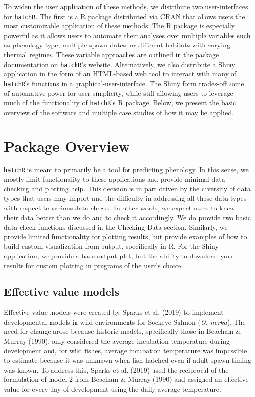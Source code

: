 \documentclass[12pt,halfline,a4paper,]{ouparticle}
\begin{document}
To widen the user application of these methods, we distribute two
user-interfaces for \texttt{hatchR}. The first is a R package
distributed via CRAN that allows users the most customizable application
of these methods. The R package is especially powerful as it allows
users to automate their analyses over multiple variables such as
phenology type, multiple spawn dates, or different habitats with varying
thermal regimes. These variable approaches are outlined in the package
documentation on \texttt{hatchR}'s website. Alternatively, we also
distribute a Shiny application in the form of an HTML-based web tool to
interact with many of \texttt{hatchR}'s functions in a
graphical-user-interface. The Shiny form trades-off some of automative
power for user simplicity, while still allowing users to leverage much
of the functionality of \texttt{hatchR}'s R package. Below, we present
the basic overview of the software and multiple case studies of how it
may be applied.

\section{Package Overview}\label{package-overview}

\texttt{hatchR} is meant to primarily be a tool for predicting
phenology. In this sense, we mostly limit functionality to these
applications and provide minimal data checking and plotting help. This
decision is in part driven by the diversity of data types that users may
import and the difficulty in addressing all those data types with
respect to various data checks. In other words, we expect users to know
their data better than we do and to check it accordingly. We do provide
two basic data check functions discussed in the Checking Data section.
Similarly, we provide limited functionality for plotting results, but
provide examples of how to build custom visualization from output,
specifically in R. For the Shiny application, we provide a base output
plot, but the ability to download your results for custom plotting in
programs of the user's choice.

\subsection{Effective value models}\label{effective-value-models}

Effective value models were created by Sparks et al. (2019) to implement
developmental models in wild environments for Sockeye Salmon (\emph{O.
nerka}). The need for change arose because historic models, specifically
those in Beacham \& Murray (1990), only considered the average
incubation temperature during development and, for wild fishes, average
incubation temperature was impossible to estimate because it was unknown
when fish hatched even if adult spawn timing was known. To address this,
Sparks et al. (2019) used the reciprocal of the formulation of model 2
from Beacham \& Murray (1990) and assigned an effective value for every
day of development using the daily average temperature.
\end{document}
